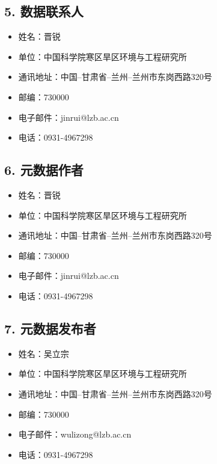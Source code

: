 \documentclass[letterpaper,10pt,english]{sphinxmanual}
\begin{document}
\subsection{5. 数据联系人}
\label{fecd46b0-3390-4580-a415-2d49ba77f9bd:id5}\begin{itemize}
\item {} 
姓名：晋锐

\item {} 
单位：中国科学院寒区旱区环境与工程研究所

\item {} 
通讯地址：中国--甘肃省--兰州--兰州市东岗西路320号

\item {} 
邮编：730000

\item {} 
电子邮件：jinrui@lzb.ac.cn

\item {} 
电话：0931-4967298

\end{itemize}


\subsection{6. 元数据作者}
\label{fecd46b0-3390-4580-a415-2d49ba77f9bd:id6}\begin{itemize}
\item {} 
姓名：晋锐

\item {} 
单位：中国科学院寒区旱区环境与工程研究所

\item {} 
通讯地址：中国--甘肃省--兰州--兰州市东岗西路320号

\item {} 
邮编：730000

\item {} 
电子邮件：jinrui@lzb.ac.cn

\item {} 
电话：0931-4967298

\end{itemize}


\subsection{7.      元数据发布者}
\label{fecd46b0-3390-4580-a415-2d49ba77f9bd:id7}\begin{itemize}
\item {} 
姓名：吴立宗

\item {} 
单位：中国科学院寒区旱区环境与工程研究所

\item {} 
通讯地址：中国--甘肃省--兰州--兰州市东岗西路320号

\item {} 
邮编：730000

\item {} 
电子邮件：wulizong@lzb.ac.cn

\item {} 
电话：0931-4967298

\end{itemize}
\end{document}
